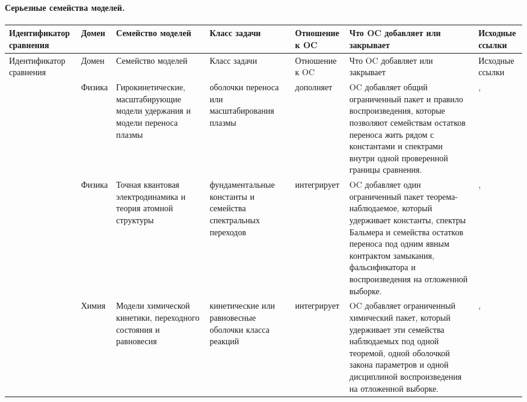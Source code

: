 \paragraph{Серьезные семейства моделей.}
\begingroup
\scriptsize
\setlength{\emergencystretch}{1.5em}
\setlength{\tabcolsep}{2pt}
\setlength{\LTleft}{0pt}
\setlength{\LTright}{0pt}
\begin{longtable}{@{}L{0.14\textwidth}L{0.09\textwidth}L{0.14\textwidth}L{0.12\textwidth}L{0.10\textwidth}L{0.18\textwidth}L{0.15\textwidth}@{}}
\toprule
Идентификатор сравнения & Домен & Семейство моделей & Класс задачи & Отношение к OC & Что OC добавляет или закрывает & Исходные ссылки \\
\midrule
\endfirsthead
\toprule
Идентификатор сравнения & Домен & Семейство моделей & Класс задачи & Отношение к OC & Что OC добавляет или закрывает & Исходные ссылки \\
\midrule
\endhead
{} & Физика & Гирокинетические, масштабирующие модели удержания и модели переноса плазмы & оболочки переноса или масштабирования плазмы & дополняет & OC добавляет общий ограниченный пакет и правило воспроизведения, которые позволяют семействам остатков переноса жить рядом с константами и спектрами внутри одной проверенной границы сравнения. & , \allowbreak {} \\
 & Физика & Точная квантовая электродинамика и теория атомной структуры & фундаментальные константы и семейства спектральных переходов & интегрирует & OC добавляет один ограниченный пакет теорема-наблюдаемое, который удерживает константы, спектры Бальмера и семейства остатков переноса под одним явным контрактом замыкания, фальсификатора и воспроизведения на отложенной выборке. & , \allowbreak {} \\
 & Химия & Модели химической кинетики, переходного состояния и равновесия & кинетические или равновесные оболочки класса реакций & интегрирует & OC добавляет ограниченный химический пакет, который удерживает эти семейства наблюдаемых под одной теоремой, одной оболочкой закона параметров и одной дисциплиной воспроизведения на отложенной выборке. & , \allowbreak {} \\

\end{longtable}
